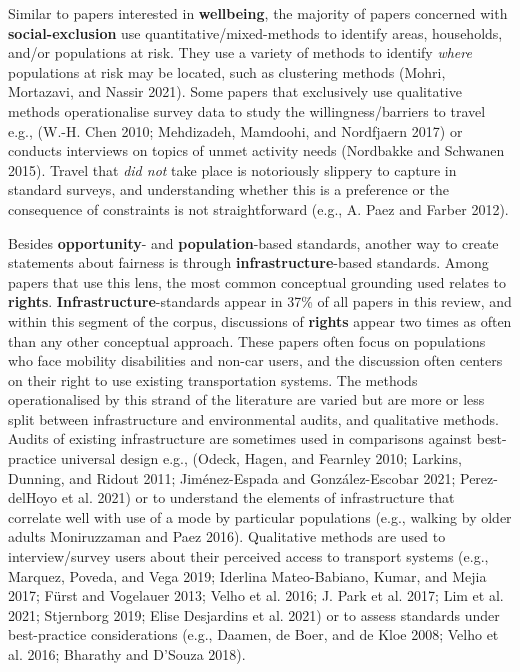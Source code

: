 \documentclass[12pt, oneside]{report}
\begin{document}
Similar to papers interested in \textbf{wellbeing}, the majority of
papers concerned with \textbf{social-exclusion} use
quantitative/mixed-methods to identify areas, households, and/or
populations at risk. They use a variety of methods to identify
\emph{where} populations at risk may be located, such as clustering
methods (Mohri, Mortazavi, and Nassir 2021). Some papers that
exclusively use qualitative methods operationalise survey data to study
the willingness/barriers to travel e.g., (W.-H. Chen 2010; Mehdizadeh,
Mamdoohi, and Nordfjaern 2017) or conducts interviews on topics of unmet
activity needs (Nordbakke and Schwanen 2015). Travel that \emph{did not}
take place is notoriously slippery to capture in standard surveys, and
understanding whether this is a preference or the consequence of
constraints is not straightforward (e.g., A. Paez and Farber 2012).

Besides \textbf{opportunity}- and \textbf{population}-based standards,
another way to create statements about fairness is through
\textbf{infrastructure}-based standards. Among papers that use this
lens, the most common conceptual grounding used relates to
\textbf{rights}. \textbf{Infrastructure}-standards appear in 37\% of all
papers in this review, and within this segment of the corpus,
discussions of \textbf{rights} appear two times as often than any other
conceptual approach. These papers often focus on populations who face
mobility disabilities and non-car users, and the discussion often
centers on their right to use existing transportation systems. The
methods operationalised by this strand of the literature are varied but
are more or less split between infrastructure and environmental audits,
and qualitative methods. Audits of existing infrastructure are sometimes
used in comparisons against best-practice universal design e.g., (Odeck,
Hagen, and Fearnley 2010; Larkins, Dunning, and Ridout 2011;
Jiménez-Espada and González-Escobar 2021; Perez-delHoyo et al. 2021) or
to understand the elements of infrastructure that correlate well with
use of a mode by particular populations (e.g., walking by older adults
Moniruzzaman and Paez 2016). Qualitative methods are used to
interview/survey users about their perceived access to transport systems
(e.g., Marquez, Poveda, and Vega 2019; Iderlina Mateo-Babiano, Kumar,
and Mejia 2017; Fürst and Vogelauer 2013; Velho et al. 2016; J. Park et
al. 2017; Lim et al. 2021; Stjernborg 2019; Elise Desjardins et al.
2021) or to assess standards under best-practice considerations (e.g.,
Daamen, de Boer, and de Kloe 2008; Velho et al. 2016; Bharathy and
D'Souza 2018).
\end{document}
